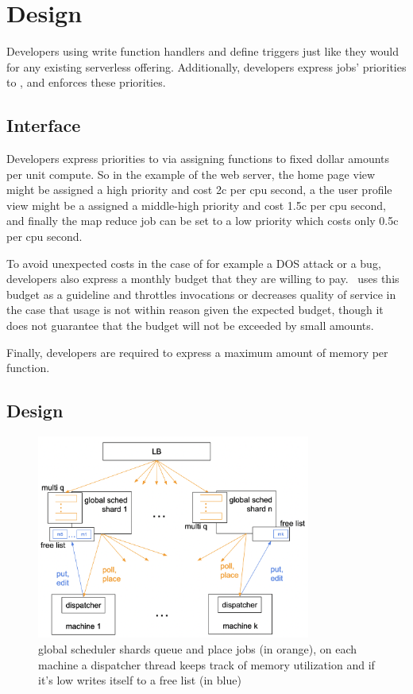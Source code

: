 \section{Design}


Developers using \sys{} write function handlers and define triggers just like
they would for any existing serverless offering. Additionally, developers
express jobs' priorities to \sys{}, and \sys{} enforces these priorities.



\subsection{Interface}

Developers express priorities to \sys{} via assigning functions to fixed dollar
amounts per unit compute. So in the example of the web server, the home page
view might be assigned a high priority and cost 2c per cpu second, a the user
profile view might be a assigned a middle-high priority and cost 1.5c per cpu
second, and finally the map reduce job can be set to a low priority which costs
only 0.5c per cpu second.
 
To avoid unexpected costs in the case of for example a DOS attack or a bug,
developers also express a monthly budget that they are willing to pay.\ \sys{}
uses this budget as a guideline and throttles invocations or decreases quality
of service in the case that usage is not within reason given the expected
budget, though it does not guarantee that the budget will not be exceeded by
small amounts.

Finally, developers are required to express a maximum amount of memory per
function.



\subsection{\sys{} Design}

\begin{figure}[t]
    \centering
      \includegraphics[width=9cm]{img/overview.png}
      \caption{ global scheduler shards queue and place jobs (in orange), 
      on each machine a dispatcher thread keeps track of memory utilization 
      and if it's low writes itself to a free list (in blue) }
    \label{fig:overview}
\end{figure}
  

